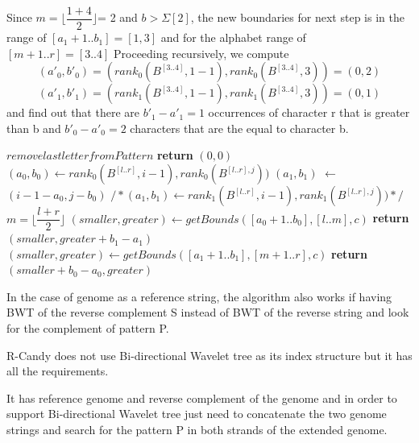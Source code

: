 \documentclass[11pt,a4paper]{report}
\begin{document}
Since  $m=\lfloor \dfrac  {1+4}{2} \rfloor$= 2 and $b > \Sigma[2]$,
the new boundaries for next step is in the range of $[a_{1}+1..b_{1}]
=[1,3]$ and for the alphabet range of $[m+1 . . r] = [3..4]$
Proceeding recursively, we compute
$$({a}'_0, b'_{0})=(rank_{0} ( B^{[3..4]} ,  1-1), rank_{0} (B^{[3..4]}, 3)) = (0 , 2) $$
$$(a'_1, b'_{1})=(rank_{1} ( B^{[3..4]} ,  1-1), rank_{1} (B^{[3..4]}, 3)) = (0 , 1) $$
and find out that there are $b'_{1}-a'_{1}=1$ occurrences 
of character r that is greater than b and $b'_{0}-a'_{0}=2 $ 
characters that are the equal to character b.
\begin{algorithm}[H]
   \caption{}
    \begin{algorithmic}[1] 
            	\State $remove last letter from Pattern$
            	\State \textbf{return} $(0,0)$
            \Else
        	     \State $(a_{0}, b_{0}) \leftarrow  rank_{0}( B^{[l..r]}, i-1), rank_{0}(B^{[l..r],j}))$
        		 \State $(a_{1}, b_{1})$ $\leftarrow$ $(i-1-a_{0}, j - b_{0}) $
        		 \State $/* (a_{1}, b_{1}) \leftarrow  rank_{1}( B^{[l..r]}, i-1), rank_{1}(B^{[l..r],j})) */$
        		 \State $m = \lfloor \dfrac  {l+r}{2} \rfloor$
        		 	\State $(smaller, greater) \leftarrow getBounds ([a_{0}+1..b_{0}],[l..m],c)$
        		 	\State \textbf{return} $(smaller, greater+b_{1}-a_{1})$
     	  		\Else 
     	  			\State $(smaller, greater) \leftarrow getBounds ([a_{1}+1..b_{1}],[m+1..r],c)$ 
     	  			\State \textbf{return} $(smaller + b_{0}-a_{0}, greater)$
     		   \EndIf
     	   \EndIf
     
    \EndFunction

	\end{algorithmic}
  \label{smaller-greater}	
\end{algorithm}

In the case of genome as a reference string, the algorithm also works if 
having BWT of the reverse complement S instead of BWT of the reverse string 
and look for the complement of pattern P.

R-Candy does not use Bi-directional Wavelet tree as its index structure 
but it has all the requirements.

It has reference genome and reverse complement of the genome and in order 
to support Bi-directional Wavelet tree just need to concatenate the two 
genome strings and search for the pattern P in both strands of the extended genome.


\end{document}
